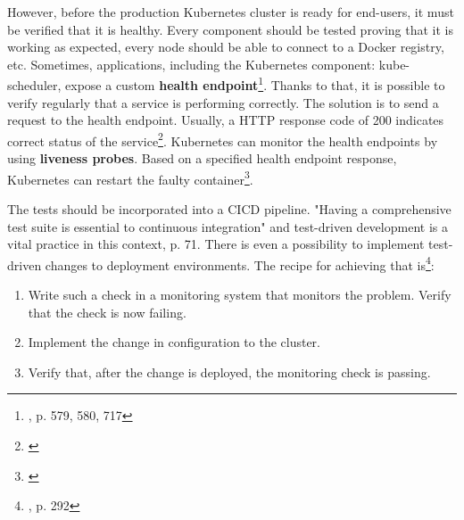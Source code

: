 However, before the production Kubernetes cluster is ready for end-users, it must be verified that it is healthy. Every component should be tested proving that it is working as expected, every node should be able to connect to a Docker registry, etc. Sometimes, applications, including the Kubernetes component: kube-scheduler, expose a custom \textbf{health endpoint}\footnote{\cite{book-devops-k8s}, p. 579, 580, 717}. Thanks to that, it is possible to verify regularly that a service is performing correctly. The solution is to send a request to the health endpoint. Usually, a HTTP response code of 200 indicates correct status of the service\footnote{\cite{online-ms-health}}. Kubernetes can monitor the health endpoints by using \textbf{liveness probes}. Based on a specified health endpoint response, Kubernetes can restart the faulty container\footnote{\cite{online-k8s-probes}}.

The tests should be incorporated into a CICD pipeline. "Having a comprehensive test suite is essential to continuous integration" and test-driven development is a vital practice in this context{\cite{book-cicd}, p. 71}. There is even a possibility to implement test-driven changes to deployment environments. The recipe for achieving that is\footnote{\cite{book-cicd}, p. 292}:
\begin{enumerate}
\item Write such a check in a monitoring system that monitors the problem. Verify that the check is now failing.
\item Implement the change in configuration to the cluster.
\item Verify that, after the change is deployed, the monitoring check is passing.
\end{enumerate}
